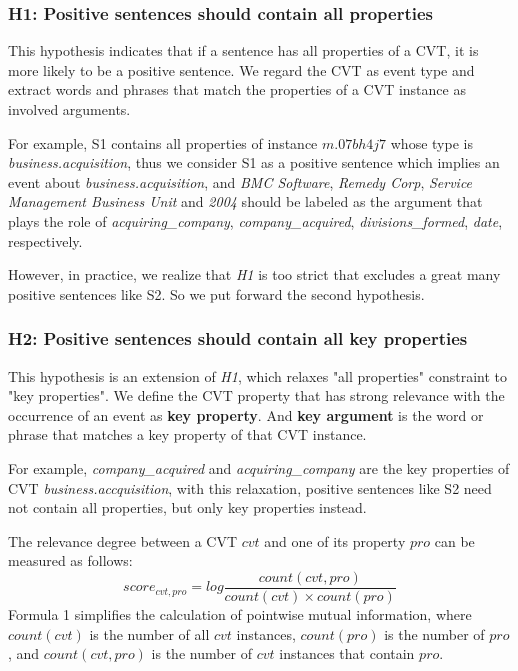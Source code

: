\documentclass{article}
\begin{document}
\subsubsection{H1: Positive sentences should contain all properties}
This hypothesis indicates that if a sentence has all properties of a CVT, it is more likely to be a positive sentence. We regard the CVT as event type and extract words and phrases that match the properties of a CVT instance as involved arguments. 

For example, S1 contains all properties of instance $m.07bh4j7$ whose type is \emph{business.acquisition}, thus we consider S1 as a positive sentence which implies an event about \emph{business.acquisition}, and \emph{BMC Software}, \emph{Remedy Corp}, \emph{Service Management Business Unit} and \emph{2004} should be labeled as the argument that plays the role of \emph{acquiring\_company}, \emph{company\_acquired}, \emph{divisions\_formed}, \emph{date}, respectively.

However, in practice, we realize that \emph{H1} is too strict that excludes a great many positive sentences like S2. So we put forward the second hypothesis.

\subsubsection{H2: Positive sentences should contain all key properties}
This hypothesis is an extension of \emph{H1}, which relaxes "all properties" constraint to "key properties". We define the CVT property that has strong relevance with the occurrence of an event as \textbf{key property}. And \textbf{key argument} is the word or phrase that matches a key property of that CVT instance. 

For example, \emph{company\_acquired} and \emph{acquiring\_company} are the key properties of CVT \emph{business.accquisition}, with this relaxation, positive sentences like S2 need not contain all properties, but only key properties instead.

The relevance degree between a CVT $cvt$ and one of its property $pro$ can be measured as follows:
\begin{equation}
	score_{cvt, pro} = log \frac{count(cvt, pro)}{count(cvt) \times count(pro)} 
\end{equation}
Formula 1 simplifies the calculation of pointwise mutual information, where $count(cvt)$ is the number of all $cvt$ instances, $count(pro)$ is the number of $pro$, and $count(cvt, pro)$ is the number of $cvt$ instances that contain $pro$.
\end{document}
